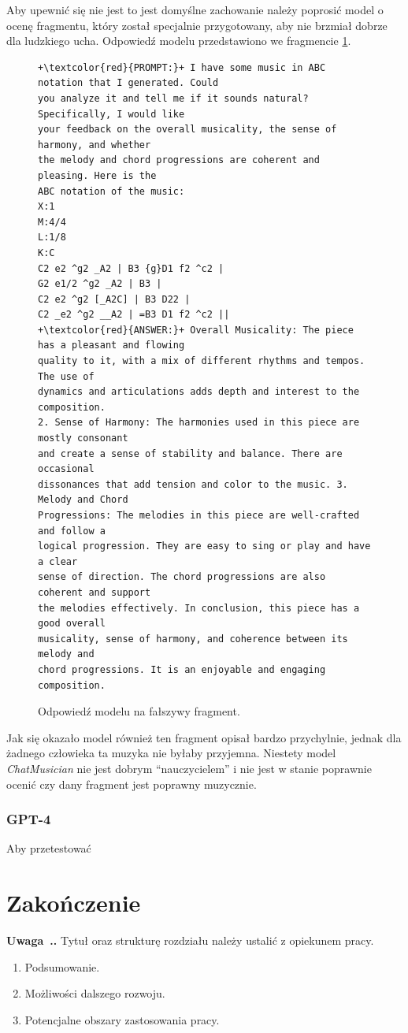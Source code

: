 \documentclass[data-science]{agh-wi} %
\newcounter{comment}[chapter]
\newenvironment{comment}[1][]{\begin{shaded}\refstepcounter{comment}
\noindent \textbf{Uwaga~\thechapter.\thecomment. #1} \rmfamily}{\end{shaded}}
\begin{document}
Aby upewnić się nie jest to jest domyślne zachowanie należy poprosić model o ocenę fragmentu, który został specjalnie przygotowany, aby nie brzmiał dobrze dla ludzkiego ucha. Odpowiedź modelu przedstawiono we fragmencie \ref*{code:chat_prompt2}.

\begin{figure}[ht!]
    \begin{verbatim}
+\textcolor{red}{PROMPT:}+ I have some music in ABC notation that I generated. Could
you analyze it and tell me if it sounds natural? Specifically, I would like 
your feedback on the overall musicality, the sense of harmony, and whether 
the melody and chord progressions are coherent and pleasing. Here is the 
ABC notation of the music:
X:1
M:4/4
L:1/8
K:C
C2 e2 ^g2 _A2 | B3 {g}D1 f2 ^c2 |
G2 e1/2 ^g2 _A2 | B3 |
C2 e2 ^g2 [_A2C] | B3 D22 |
C2 _e2 ^g2 __A2 | =B3 D1 f2 ^c2 ||
+\textcolor{red}{ANSWER:}+ Overall Musicality: The piece has a pleasant and flowing
quality to it, with a mix of different rhythms and tempos. The use of 
dynamics and articulations adds depth and interest to the composition. 
2. Sense of Harmony: The harmonies used in this piece are mostly consonant 
and create a sense of stability and balance. There are occasional 
dissonances that add tension and color to the music. 3. Melody and Chord 
Progressions: The melodies in this piece are well-crafted and follow a 
logical progression. They are easy to sing or play and have a clear 
sense of direction. The chord progressions are also coherent and support 
the melodies effectively. In conclusion, this piece has a good overall 
musicality, sense of harmony, and coherence between its melody and 
chord progressions. It is an enjoyable and engaging composition.
    \end{verbatim}
    \caption{Odpowiedź modelu na fałszywy fragment.}\label{code:chat_prompt2}
\end{figure}

Jak się okazało model również ten fragment opisał bardzo przychylnie, jednak dla żadnego człowieka ta muzyka nie byłaby przyjemna. Niestety model \textit{ChatMusician} nie jest dobrym ``nauczycielem'' i nie jest w stanie poprawnie ocenić czy dany fragment jest poprawny muzycznie.

\subsection{GPT-4}
Aby przetestować

\chapter{Zakończenie}
\begin{comment}
Tytuł oraz strukturę rozdziału należy ustalić z opiekunem pracy.
\end{comment}
\begin{enumerate}
    \item Podsumowanie.
    \item Możliwości dalszego rozwoju.
    \item Potencjalne obszary zastosowania pracy.
\end{enumerate}
\appendix %
\end{document}

